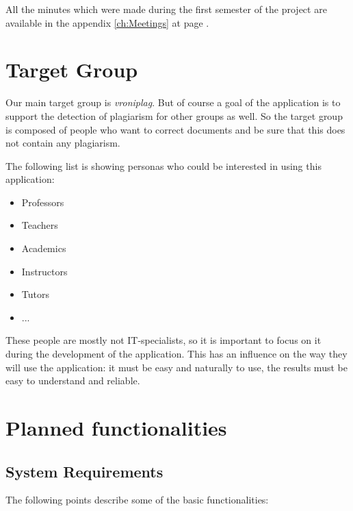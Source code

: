 All the minutes which were made during the first semester of the project are available in the appendix \ref{ch:Meetings} 
at page \pageref{ch:Meetings}.

\section{Target Group}

Our main target group is \textit{vroniplag}.
\minisec{}
But of course a goal of the application is to support the detection of plagiarism for other groups as well. So the target group is composed of people who want to correct documents and be sure that this does not contain any plagiarism.

The following list is showing personas who could be interested in using this application:

\begin{itemize}
\item Professors 
\item Teachers
\item Academics
\item Instructors
\item Tutors
\item ...
\end{itemize}

These people are mostly not IT-specialists, so it is important to focus on it during the development of the application. This has an influence on the way they will use the application: it must be easy and naturally to use, the results must be easy to understand and reliable.

\section{Planned functionalities}
\subsection{System Requirements}

The following points describe some of the basic functionalities:

